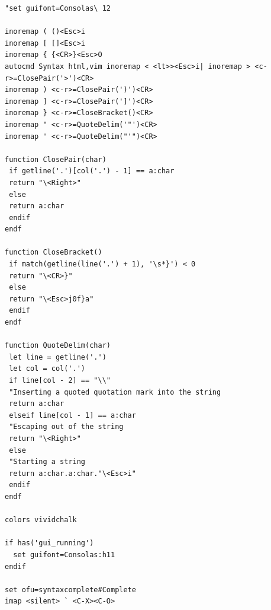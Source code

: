 \documentclass[a4paper]{article}
\begin{document}
\begin{CJK*}{UTF8}{gbsn}
\begin{multicols}{3}
\begin{flushleft}
\begin{lstlisting}
"set guifont=Consolas\ 12

inoremap ( ()<Esc>i
inoremap [ []<Esc>i
inoremap { {<CR>}<Esc>O
autocmd Syntax html,vim inoremap < <lt>><Esc>i| inoremap > <c-r>=ClosePair('>')<CR>
inoremap ) <c-r>=ClosePair(')')<CR>
inoremap ] <c-r>=ClosePair(']')<CR>
inoremap } <c-r>=CloseBracket()<CR>
inoremap " <c-r>=QuoteDelim('"')<CR>
inoremap ' <c-r>=QuoteDelim("'")<CR>

function ClosePair(char)
 if getline('.')[col('.') - 1] == a:char
 return "\<Right>"
 else
 return a:char
 endif
endf

function CloseBracket()
 if match(getline(line('.') + 1), '\s*}') < 0
 return "\<CR>}"
 else
 return "\<Esc>j0f}a"
 endif
endf

function QuoteDelim(char)
 let line = getline('.')
 let col = col('.')
 if line[col - 2] == "\\"
 "Inserting a quoted quotation mark into the string
 return a:char
 elseif line[col - 1] == a:char
 "Escaping out of the string
 return "\<Right>"
 else
 "Starting a string
 return a:char.a:char."\<Esc>i"
 endif
endf

colors vividchalk

if has('gui_running')
  set guifont=Consolas:h11
endif

set ofu=syntaxcomplete#Complete
imap <silent> ` <C-X><C-O>
\end{lstlisting}

\begin{lstlisting}
\end{lstlisting}

\end{flushleft}
\clearpage
\end{multicols}

 \newpage

\end{CJK*}
\end{document}
